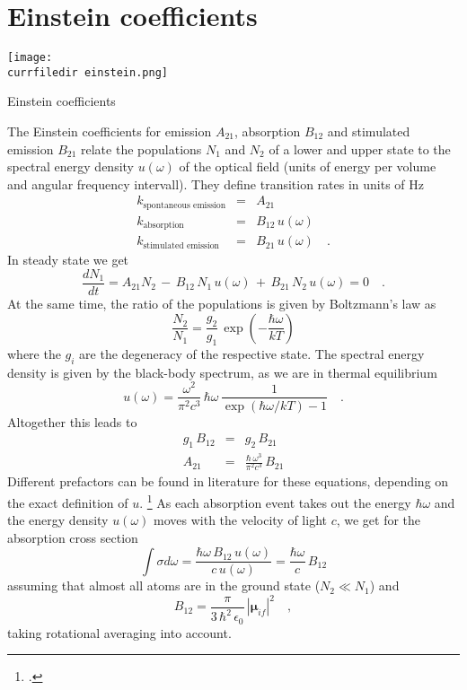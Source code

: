 \section{Einstein coefficients}

\begin{marginfigure}
   \texttt{[image: \\currfiledir einstein.png]}

  \caption{Einstein coefficients}
\end{marginfigure}


The Einstein coefficients for emission $A_{21}$, absorption $B_{12}$ and stimulated emission $B_{21}$ relate the populations $N_1$ and $N_2$ of a lower and upper state to the spectral energy density $u(\omega)$ of the optical field (units of energy per volume and angular frequency intervall). They define transition rates in units of Hz
\begin{eqnarray}
 k_{\text{spontaneous emission}} &=& A_{21} \\
  k_{\text{absorption}}  & = & B_{12} \,   u(\omega) \\
  k_{\text{stimulated emission }} & =&  B_{21} \,  u(\omega)  \quad .
\end{eqnarray}
%
In steady state we get
\begin{equation}
 \frac{d N_1}{dt} =  A_{21} N_2 \, - \, B_{12} \, N_1 \, u(\omega) \, + \, B_{21}\, N_2 \,u(\omega)  = 0 \quad .
\end{equation}
At the same time, the ratio of the populations is given by Boltzmann's law as
\begin{equation}
 \frac{N_2}{N_1} = \frac{g_2}{g_1} \, \exp \left( - \frac{\hbar \omega}{kT} \right)
\end{equation}
where the $g_i$ are the degeneracy of the respective state. The spectral energy density is given by the black-body spectrum, as we are in thermal equilibrium
\begin{equation}
 u(\omega) = \frac{\omega^2}{\pi^2 c^3} \, \hbar \omega \, \frac{1}{\exp \left( \hbar \omega / kT \right) - 1} \quad .
\end{equation}
Altogether this leads to 
\begin{eqnarray}
 g_1 \, B_{12} &=& g_2 \, B_{21} \\
 A_{21} &=&  \frac{\hbar \, \omega^3}{\pi^2 c^3} \, B_{21} 
\end{eqnarray}
Different prefactors can be found in literature for these equations, depending on the exact definition of $u$.
 \footcite{Hilborn:2002wj} 
 As each absorption event takes out the energy $\hbar \omega$ and the energy density $u(\omega)$ moves with the velocity of light $c$, we get for the absorption cross section
\begin{equation}
\int \sigma d \omega = \frac{\hbar \omega \, B_{12} \, u(\omega)  }{c \, u(\omega) }  =
   \frac{\hbar \omega  }{c  }    \, B_{12}
\end{equation}
assuming that almost all atoms are in the ground state ($N_2 \ll N_1$) and
\begin{equation}
B_{12} = \frac{\pi}{3 \, \hbar^2 \, \epsilon_0} \,  |\mathbf{\mu}_{if} |^2  \quad ,
\end{equation}
taking rotational averaging into account.




